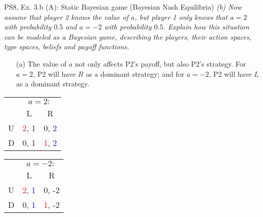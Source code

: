 \begin{frame}{PS8, Ex. 3.b (A): Static Bayesian game (Bayesian Nash Equilibria)}
    \textit{(b) Now assume that player 2 knows the value of $a$, but player 1 only knows that $a=2$ with probability $0.5$ and $a=-2$ with probability $0.5$. Explain how this situation can be modeled as a Bayesian game, describing the players, their action spaces, type spaces, beliefs and payoff functions.}
    \vspace{-8pt}
    \begin{multicols}{2}
      \begin{itemize}
      \item[(a)] The value of $a$ not only affects P2's payoff, but also P2's strategy. For $a=2$, P2 will have $R$ as a dominant strategy; and for $a=-2$, P2 will have $L$ as a dominant strategy.
      \end{itemize}
      \vfill\null\columnbreak
      \begin{table}
          \begin{tabular}{l|c|c|}
          \multicolumn{1}{c}{} & \multicolumn{2}{c}{$a=2:$} \\
          \multicolumn{1}{c}{} & \multicolumn{1}{c}{L} & \multicolumn{1}{c}{\color{blue}R} \\\cline{2-3}
          U & \textcolor{red}{2}, 1 & 0, \textcolor{blue}{2} \\\cline{2-3}
          D & 0, 1 & \textcolor{red}{1}, \textcolor{blue}{2} \\\cline{2-3}
        \end{tabular}
      \end{table}
      \vspace{-8pt}
      \begin{table}
        \begin{tabular}{l|c|c|}
          \multicolumn{1}{c}{} & \multicolumn{2}{c}{$a=-2:$} \\
          \multicolumn{1}{c}{} & \multicolumn{1}{c}{\color{blue}L} & \multicolumn{1}{c}{R} \\\cline{2-3}
          U & \textcolor{red}{2}, \textcolor{blue}{1} & 0, -2 \\\cline{2-3}
          D & 0, \textcolor{blue}{1} & \textcolor{red}{1}, -2 \\\cline{2-3}
        \end{tabular}
      \end{table}
      \vfill\null
    \end{multicols}
\end{frame}
